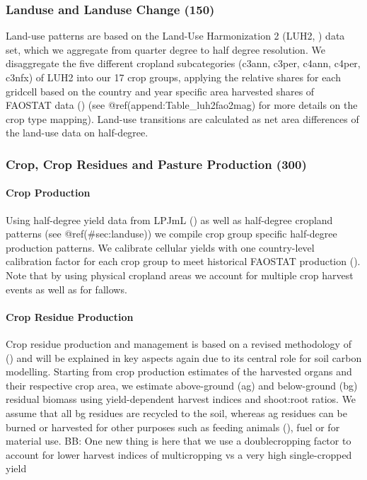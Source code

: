 \documentclass[gc, manuscript]{copernicus}
\begin{document}
\hypertarget{sec:landuse}{%
\subsubsection{Landuse and Landuse Change (150)}\label{sec:landuse}}

Land-use patterns are based on the Land-Use Harmonization 2 (LUH2,
\citep{LUH2}) data set, which we aggregate from quarter degree to half
degree resolution. We disaggregate the five different cropland
subcategories (c3ann, c3per, c4ann, c4per, c3nfx) of LUH2 into our 17
crop groups, applying the relative shares for each gridcell based on the
country and year specific area harvested shares of FAOSTAT data
(\citep{FAOSTAT}) (see @ref(append:Table\_luh2fao2mag) for more details
on the crop type mapping). Land-use transitions are calculated as net
area differences of the land-use data on half-degree.

\subsubsection{Crop, Crop Residues and Pasture Production (300)}

\paragraph{Crop Production}

Using half-degree yield data from LPJmL (\citep{LPJmL4_1}) as well as
half-degree cropland patterns (see @ref(\#sec:landuse)) we compile crop
group specific half-degree production patterns. We calibrate cellular
yields with one country-level calibration factor for each crop group to
meet historical FAOSTAT production (\citep{FAOSTAT}). Note that by using
physical cropland areas we account for multiple crop harvest events as
well as for fallows.

\paragraph{Crop Residue Production}

Crop residue production and management is based on a revised methodology
of (\citep{bodirsky2012}) and will be explained in key aspects again due
to its central role for soil carbon modelling. Starting from crop
production estimates of the harvested organs and their respective crop
area, we estimate above-ground (ag) and below-ground (bg) residual
biomass using yield-dependent harvest indices and shoot:root ratios. We
assume that all bg residues are recycled to the soil, whereas ag
residues can be burned or harvested for other purposes such as feeding
animals (\citep{weindl}), fuel or for material use. BB: One new thing is
here that we use a doublecropping factor to account for lower harvest
indices of multicropping vs a very high single-cropped yield
\end{document}
